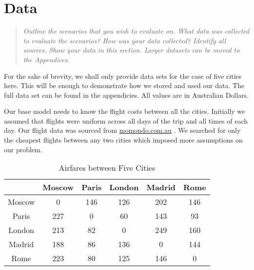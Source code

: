 \documentclass[12pt]{article}
\begin{document}
\pagebreak

\section{Data} 
\label{sec:data}


\begin{quote} \textit{
Outline the scenarios that you wish to evaluate on. What data was collected to evaluate the
scenarios? How was your data collected? Identify all sources. Show your data in this section.
Larger datasets can be moved to the Appendices.
} \end{quote}

For the sake of brevity, we shall only provide data sets for the case of five cities here. This will be enough to demonstrate how we stored and used our data. The full data set can be found in the appendicies. All values are in Australian Dollars.

Our base model needs to know the flight costs between all the cities. Initially we assumed that flights were uniform across all days of the trip and all times of each day. Our flight data was sourced from \url{momondo.com.au} \cite{momondo}. We searched for only the cheapest flights between any two cities which imposed more assumptions on our problem.

\begin{table}[h]
\caption{Airfares between Five Cities}
\centering
\vspace{1mm}
\begin{tabular}{c|c|c|c|c|c}
\hline
\rule{0pt}{2ex}  & Moscow & Paris & London & Madrid & Rome \\
\hline
\rule{0pt}{2ex}Moscow & 0 & 146 & 126 & 202 & 146 \\
Paris & 227 & 0 & 60 & 143 & 93 \\
London & 213 & 82 & 0 & 249 & 160 \\
Madrid & 188 & 86 & 136 & 0 & 144 \\
Rome & 223 & 80 & 125 & 146 & 0 \\

\end{tabular}
\end{table}
\end{document}
